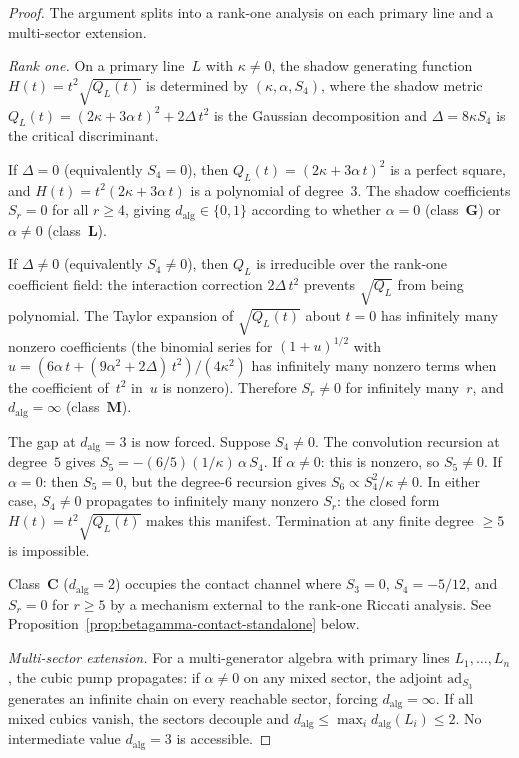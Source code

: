 \documentclass[11pt]{article}
\theoremstyle{plain}
\theoremstyle{definition}
\theoremstyle{remark}
\begin{document}
\begin{proof}
The argument splits into a rank-one analysis on each primary
line and a multi-sector extension.

\emph{Rank one.}
On a primary line~$L$ with $\kappa \neq 0$, the shadow generating
function $H(t) = t^2 \sqrt{Q_L(t)}$ is determined by
$(\kappa, \alpha, S_4)$, where the shadow metric
$Q_L(t) = (2\kappa + 3\alpha\, t)^2 + 2\Delta\, t^2$
is the Gaussian decomposition and
$\Delta = 8\kappa S_4$ is the critical discriminant.

If $\Delta = 0$ (equivalently $S_4 = 0$), then
$Q_L(t) = (2\kappa + 3\alpha\, t)^2$ is a perfect square, and
$H(t) = t^2(2\kappa + 3\alpha\, t)$ is a polynomial of
degree~$3$. The shadow coefficients $S_r = 0$ for all
$r \geq 4$, giving $d_{\mathrm{alg}} \in \{0, 1\}$ according
to whether $\alpha = 0$ (class~$\mathbf{G}$) or
$\alpha \neq 0$ (class~$\mathbf{L}$).

If $\Delta \neq 0$ (equivalently $S_4 \neq 0$), then $Q_L$ is
irreducible over the rank-one coefficient field: the interaction correction
$2\Delta\, t^2$ prevents $\sqrt{Q_L}$ from being polynomial.
The Taylor expansion of $\sqrt{Q_L(t)}$ about $t = 0$ has
infinitely many nonzero coefficients (the binomial series for
$(1 + u)^{1/2}$ with
$u = (6\alpha\,t + (9\alpha^2 + 2\Delta)\,t^2)/(4\kappa^2)$
has infinitely many nonzero terms when the coefficient of~$t^2$ in~$u$
is nonzero). Therefore $S_r \neq 0$ for infinitely many~$r$,
and $d_{\mathrm{alg}} = \infty$ (class~$\mathbf{M}$).

The gap at $d_{\mathrm{alg}} = 3$ is now forced. Suppose
$S_4 \neq 0$. The convolution recursion at degree~$5$ gives
$S_5 = -(6/5)(1/\kappa)\,\alpha\,S_4$.
If $\alpha \neq 0$: this is nonzero, so $S_5 \neq 0$.
If $\alpha = 0$: then $S_5 = 0$, but the degree-$6$ recursion
gives $S_6 \propto S_4^2/\kappa \neq 0$. In either case,
$S_4 \neq 0$ propagates to infinitely many nonzero $S_r$: the
closed form $H(t) = t^2\sqrt{Q_L(t)}$ makes this manifest.
Termination at any finite degree $\geq 5$ is impossible.

Class~$\mathbf{C}$ ($d_{\mathrm{alg}} = 2$) occupies the
contact channel where $S_3=0$, $S_4=-5/12$, and $S_r=0$ for
$r\geq5$ by a mechanism external to the rank-one Riccati analysis. See
Proposition~\ref{prop:betagamma-contact-standalone} below.

\emph{Multi-sector extension.}
For a multi-generator algebra with primary lines
$L_1, \dotsc, L_n$, the cubic pump propagates: if
$\alpha \neq 0$ on any mixed sector, the adjoint
$\mathrm{ad}_{S_3}$ generates an infinite chain on every
reachable sector, forcing $d_{\mathrm{alg}} = \infty$. If all
mixed cubics vanish, the sectors decouple and
$d_{\mathrm{alg}} \leq \max_i d_{\mathrm{alg}}(L_i) \leq 2$.
No intermediate value $d_{\mathrm{alg}} = 3$ is accessible.
\end{proof}
\end{document}
